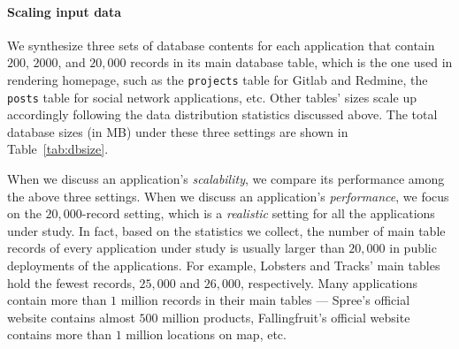 

\vspace{-0.08in} 
\paragraph{\bf Scaling input data}
We synthesize three sets of database contents for each application that contain $200$, $2000$, and $20,000$ records in its main database table, which is the one used in rendering homepage, such as the \texttt{projects} table for Gitlab and Redmine, 
the \texttt{posts} table 
for social network applications, etc. 
Other tables' sizes scale up accordingly following the data distribution statistics discussed above. The total database sizes (in MB) under these three settings are shown in Table~\ref{tab:dbsize}.

When we discuss an application's {\it scalability}, we compare its performance among the above three settings. 
When we discuss an application's {\it performance}, we focus on the $20,000$-record setting, which is a {\em realistic} setting for all the applications under study. In fact, based on the statistics we collect, the number of main table records of every application under study is usually larger than $20,000$ in public deployments of the applications. For example, Lobsters and Tracks' main tables hold the fewest records, $25,000$ and $26,000$, respectively. Many applications contain more than $1$ million records in their main tables --- Spree's official website contains almost $500$ million products, Fallingfruit's official website contains more than $1$ million locations on map, etc.

%






\vspace{-0.08in} 

